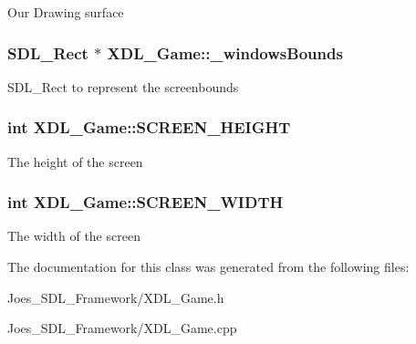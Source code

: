 Our Drawing surface \hypertarget{class_x_d_l___game_aba18e8d33ee6e87494ebb958f2beee67}{
\subsubsection[{\-\_\-windows\-Bounds}]{\setlength{\rightskip}{0pt plus 5cm}S\-D\-L\-\_\-\-Rect $\ast$ X\-D\-L\-\_\-\-Game\-::\-\_\-windows\-Bounds\hspace{0.3cm}{\ttfamily [static]}}}\label{class_x_d_l___game_aba18e8d33ee6e87494ebb958f2beee67}
S\-D\-L\-\_\-\-Rect to represent the screenbounds \hypertarget{class_x_d_l___game_a9fde7fa33a7816a1e3f17313ebca9001}{
\subsubsection[{S\-C\-R\-E\-E\-N\-\_\-\-H\-E\-I\-G\-H\-T}]{\setlength{\rightskip}{0pt plus 5cm}int X\-D\-L\-\_\-\-Game\-::\-S\-C\-R\-E\-E\-N\-\_\-\-H\-E\-I\-G\-H\-T\hspace{0.3cm}{\ttfamily [static]}}}\label{class_x_d_l___game_a9fde7fa33a7816a1e3f17313ebca9001}
The height of the screen \hypertarget{class_x_d_l___game_a2168cd95816117ff5f905692439aeb72}{
\subsubsection[{S\-C\-R\-E\-E\-N\-\_\-\-W\-I\-D\-T\-H}]{\setlength{\rightskip}{0pt plus 5cm}int X\-D\-L\-\_\-\-Game\-::\-S\-C\-R\-E\-E\-N\-\_\-\-W\-I\-D\-T\-H\hspace{0.3cm}{\ttfamily [static]}}}\label{class_x_d_l___game_a2168cd95816117ff5f905692439aeb72}
The width of the screen 

The documentation for this class was generated from the following files\-:\begin{DoxyCompactItemize}
\item 
Joes\-\_\-\-S\-D\-L\-\_\-\-Framework/X\-D\-L\-\_\-\-Game.\-h\item 
Joes\-\_\-\-S\-D\-L\-\_\-\-Framework/X\-D\-L\-\_\-\-Game.\-cpp\end{DoxyCompactItemize}
